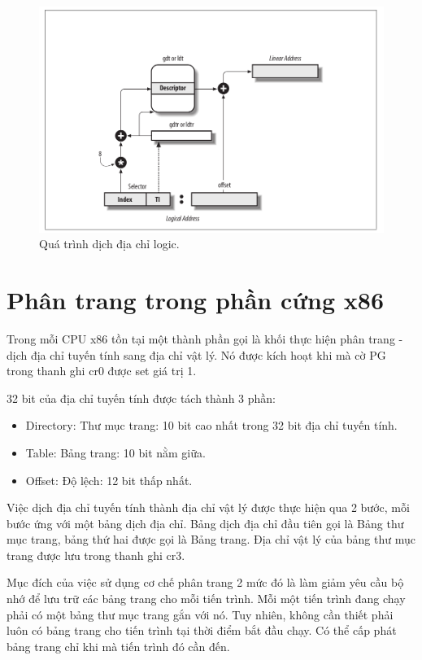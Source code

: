 \documentclass[12pt]{report}
\begin{document}
\begin{figure}[h]
\centering
\caption{Quá trình dịch địa chỉ logic.}
\includegraphics[width=\textwidth]{logic_translate.png}
\end{figure}

\section{Phân trang trong phần cứng x86}
Trong mỗi CPU x86 tồn tại một thành phần gọi là khối thực hiện phân trang - dịch địa chỉ tuyến tính sang địa chỉ vật lý. Nó được kích hoạt khi mà cờ PG trong thanh ghi cr0 được set giá trị 1. 

32 bit của địa chỉ tuyến tính được tách thành 3 phần:
\begin{itemize}
\item Directory: Thư mục trang: 10 bit cao nhất trong 32 bit địa chỉ tuyến tính. 
\item Table: Bảng trang: 10 bit nằm giữa.
\item Offset: Độ lệch: 12 bit thấp nhất. 
\end{itemize} 

Việc dịch địa chỉ tuyến tính thành địa chỉ vật lý được thực hiện qua 2 bước, mỗi bước ứng với một bảng dịch địa chỉ. Bảng dịch địa chỉ đầu tiên gọi là Bảng thư mục trang, bảng thứ hai được gọi là Bảng trang. Địa chỉ vật lý của bảng thư mục trang được lưu trong thanh ghi cr3.

Mục đích của việc sử dụng cơ chế phân trang 2 mức đó là làm giảm yêu cầu bộ nhớ để lưu trữ các bảng trang cho mỗi tiến trình. Mỗi một tiến trình đang chạy phải có một bảng thư mục trang gắn với nó. Tuy nhiên, không cần thiết phải luôn có bảng trang cho tiến trình tại thời điểm bắt đầu chạy. Có thể cấp phát bảng trang chỉ khi mà tiến trình đó cần đến.
\end{document}
